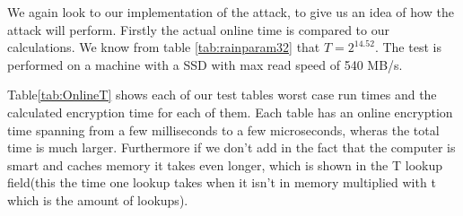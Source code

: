 We again look to our  implementation of the attack, to
give us an idea of how the attack will perform. Firstly the actual
online time is compared to our calculations. We know from table
\ref{tab:rainparam32} that $T=2^{14.52}$.  The test is performed on a
machine with a SSD with max read speed of 540 MB/s.
 
Table\ref{tab:OnlineT} shows each of our test tables worst case run times and the calculated
encryption time for each of them. Each  table has an online encryption
time spanning from a few milliseconds to a few microseconds, wheras the
total time is  much larger. Furthermore if we don't add in the fact
that the computer is smart and caches memory it takes even longer,
which is shown in the T lookup field(this the time one lookup takes
when it isn't in memory multiplied with t which is the amount of
lookups).

